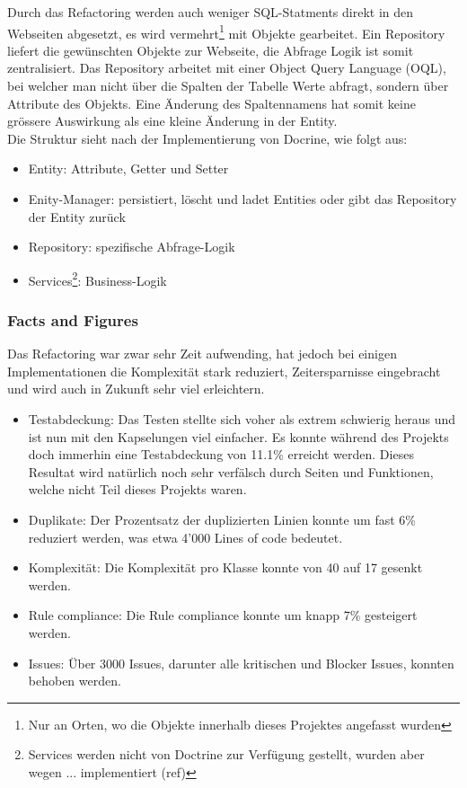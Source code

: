 \FloatBarrier
Durch das Refactoring werden auch weniger SQL-Statments direkt in den Webseiten abgesetzt, es wird vermehrt\footnote{Nur an Orten, wo die Objekte innerhalb dieses Projektes angefasst wurden} mit Objekte gearbeitet. Ein Repository liefert die gewünschten Objekte zur Webseite, die Abfrage Logik ist somit zentralisiert. Das Repository arbeitet mit einer Object Query Language (OQL), bei welcher man nicht über die Spalten der Tabelle Werte abfragt, sondern über Attribute des Objekts. Eine Änderung des Spaltennamens hat somit keine grössere Auswirkung als eine kleine Änderung in der Entity. \\

Die Struktur sieht nach der Implementierung von Docrine, wie folgt aus:
\begin{itemize}
\item Entity: Attribute, Getter und Setter
\item Enity-Manager: persistiert, löscht und ladet Entities oder gibt das Repository der Entity zurück
\item Repository: spezifische Abfrage-Logik
\item Services\footnote{Services werden nicht von Doctrine zur Verfügung gestellt, wurden aber wegen ... implementiert (ref)}: Business-Logik
\end{itemize}

\newpage
\subsubsection{Facts and Figures}
Das Refactoring war zwar sehr Zeit aufwending, hat jedoch bei einigen Implementationen die Komplexität stark reduziert, Zeitersparnisse eingebracht und wird auch in Zukunft sehr viel erleichtern.
\begin{itemize}
\item Testabdeckung: Das Testen stellte sich voher als extrem schwierig heraus und ist nun mit den Kapselungen viel einfacher. Es konnte während des Projekts doch immerhin eine Testabdeckung von 11.1\% erreicht werden. Dieses Resultat wird natürlich noch sehr verfälsch durch Seiten und Funktionen, welche nicht Teil dieses Projekts waren.
\item Duplikate: Der Prozentsatz der duplizierten Linien konnte um fast 6\% reduziert werden, was etwa 4'000 Lines of code bedeutet.
\item Komplexität: Die Komplexität pro Klasse konnte von 40 auf 17 gesenkt werden.
\item Rule compliance: Die Rule compliance konnte um knapp 7\% gesteigert werden.
\item Issues: Über 3000 Issues, darunter alle kritischen und Blocker Issues, konnten behoben werden.
\end{itemize}


